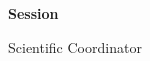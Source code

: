 \begin{titlepage}
    \begin{center}
        \large
        \MakeUppercase{\university}
        
        \LARGE
        \textbf{\MakeUppercase{\faculty}}
        
        \vspace{8cm}
        \huge
        \textbf{\thesistitle}
        
        \vspace{2cm}
        \LARGE
        \textbf{\authornamefl}
        
        \vfill
        \Large
        \textbf{Session} \session
        
        \vspace{4cm}
        \Large
        Scientific Coordinator
        
        \vspace{0.5cm}
        \LARGE
        \textbf{\coordinator}
    \end{center}
\end{titlepage}
